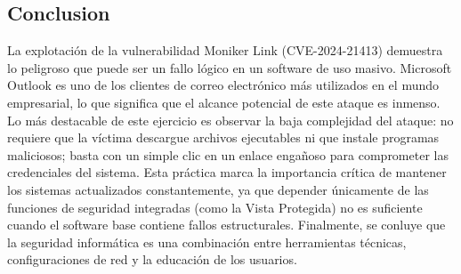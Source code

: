 \subsection{Conclusion}
La explotación de la vulnerabilidad Moniker Link (CVE-2024-21413) demuestra lo peligroso que puede ser un fallo lógico en un software de uso masivo. Microsoft Outlook es uno de los clientes de correo electrónico más utilizados en el mundo empresarial, lo que significa que el alcance potencial de este ataque es inmenso.\\
Lo más destacable de este ejercicio es observar la baja complejidad del ataque: no requiere que la víctima descargue archivos ejecutables ni que instale programas maliciosos; basta con un simple clic en un enlace engañoso para comprometer las credenciales del sistema. Esta práctica marca la importancia crítica de mantener los sistemas actualizados constantemente, ya que depender únicamente de las funciones de seguridad integradas (como la Vista Protegida) no es suficiente cuando el software base contiene fallos estructurales. Finalmente, se conluye que la seguridad informática es una combinación entre herramientas técnicas, configuraciones de red y la educación de los usuarios.

